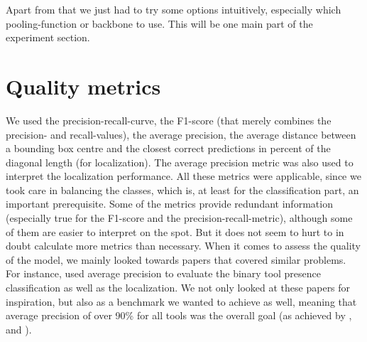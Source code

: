 Apart from that we just had to try some options intuitively, especially which pooling-function or backbone to use. This will be one main part of the experiment section.

\section{Quality metrics}

We used the precision-recall-curve, the F1-score (that merely combines the precision- and recall-values), the average precision, the average distance between a bounding box centre and the closest correct predictions in percent of the diagonal length (for localization). The average precision metric was also used to interpret the localization performance. All these metrics were applicable, since we took care in balancing the classes, which is, at least for the classification part, an important prerequisite. Some of the metrics provide redundant information (especially true for the F1-score and the precision-recall-metric), although some of them are easier to interpret on the spot. But it does not seem to hurt to in doubt calculate more metrics than necessary.
When it comes to assess the quality of the model, we mainly looked towards papers that covered similar problems. For instance, \cite{Vardazaryan} used average precision to evaluate the binary tool presence classification as well as the localization. We not only looked at these papers for inspiration, but also as a benchmark we wanted to achieve as well, meaning that average precision of over 90\% for all tools was the overall goal (as achieved by \cite{Vardazaryan}, \cite{endonet} and \cite{lstm}).

